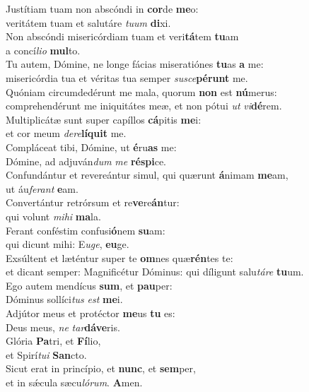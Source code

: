 \oddverse Justítiam tuam non abscóndi in \textbf{cor}de \textbf{me}o:~\*\\
\oddverse veritátem tuam et salutáre \textit{tu}\textit{um} \textbf{di}xi.\\
\evenverse Non abscóndi misericórdiam tuam et veri\textbf{tá}tem \textbf{tu}am~\*\\
\evenverse a concí\textit{li}\textit{o} \textbf{mul}to.\\
\oddverse Tu autem, Dómine, ne longe fácias miseratiónes \textbf{tu}as \textbf{a} me:~\*\\
\oddverse misericórdia tua et véritas tua semper \textit{su}\textit{sce}\textbf{pé}\textbf{runt} me.\\
\evenverse Quóniam circumdedérunt me mala, quorum \textbf{non} est \textbf{nú}merus:~\*\\
\evenverse comprehendérunt me iniquitátes meæ, et non pótui \textit{ut} \textit{vi}\textbf{dé}rem.\\
\oddverse Multiplicátæ sunt super capíllos \textbf{cá}pitis \textbf{me}i:~\*\\
\oddverse et cor meum \textit{de}\textit{re}\textbf{lí}\textbf{quit} me.\\
\evenverse Compláceat tibi, Dómine, ut \textbf{é}ru\textbf{as} me:~\*\\
\evenverse Dómine, ad adjuván\textit{dum} \textit{me} \textbf{ré}\textbf{spi}ce.\\
\oddverse Confundántur et revereántur simul, qui quærunt \textbf{á}nimam \textbf{me}am,~\*\\
\oddverse ut áu\textit{fe}\textit{rant} \textbf{e}am.\\
\evenverse Convertántur retrórsum et re\textbf{ve}re\textbf{án}tur:~\*\\
\evenverse qui volunt \textit{mi}\textit{hi} \textbf{ma}la.\\
\oddverse Ferant conféstim confusi\textbf{ó}nem \textbf{su}am:~\*\\
\oddverse qui dicunt mihi: E\textit{u}\textit{ge}, \textbf{e}\textbf{u}ge.\\
\evenverse Exsúltent et læténtur super te \textbf{om}nes quæ\textbf{rén}tes te:~\*\\
\evenverse et dicant semper: Magnificétur Dóminus: qui díligunt salu\textit{tá}\textit{re} \textbf{tu}um.\\
\oddverse Ego autem mendícus \textbf{sum}, et \textbf{pau}per:~\*\\
\oddverse Dóminus sollíci\textit{tus} \textit{est} \textbf{me}i.\\
\evenverse Adjútor meus et protéctor \textbf{me}us \textbf{tu} es:~\*\\
\evenverse Deus meus, \textit{ne} \textit{tar}\textbf{dá}\textbf{ve}ris.\\
\oddverse Glória \textbf{Pa}tri, et \textbf{Fí}lio,~\*\\
\oddverse et Spirí\textit{tu}\textit{i} \textbf{San}cto.\\
\evenverse Sicut erat in princípio, et \textbf{nunc}, et \textbf{sem}per,~\*\\
\evenverse et in sǽcula sæcu\textit{ló}\textit{rum}. \textbf{A}men.\\
